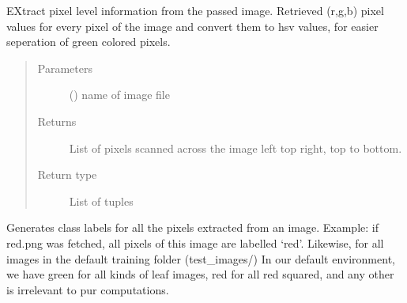 \documentclass[letterpaper,10pt,english]{sphinxmanual}
\begin{document}

\begin{fulllineitems}
\label{\detokenize{basefunctions:basefunctions.alter_calc}}
EXtract pixel level information from the passed image. Retrieved (r,g,b) pixel values for every pixel of the image and convert them to hsv values,
for easier seperation of green colored pixels.
\begin{quote}\begin{description}
\item[{Parameters}] \leavevmode
{} () \textendash{} name of image file

\item[{Returns}] \leavevmode
List of pixels scanned across the image left top right, top to bottom.

\item[{Return type}] \leavevmode
List of tuples

\end{description}\end{quote}

\end{fulllineitems}


\begin{fulllineitems}
\label{\detokenize{basefunctions:basefunctions.generateClassLabels}}
Generates class labels for all the pixels extracted from an image.
Example: if red.png was fetched, all pixels of this image are labelled ‘red’. Likewise, for all images in the default training folder (test\_images/)
In our default environment, we have green for all kinds of leaf images, red for all red squared, and any other is irrelevant to pur computations.

\end{fulllineitems}

\end{document}

